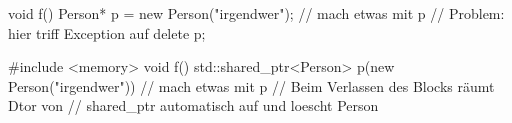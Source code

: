 void f()
{
    Person* p = new Person("irgendwer");
    // mach etwas mit p
    // Problem: hier triff Exception auf
    delete p;
}



#include <memory>
void f()
{
    std::shared_ptr<Person> p(new Person("irgendwer"))
    // mach etwas mit p
    // Beim Verlassen des Blocks räumt Dtor von 
    // shared_ptr automatisch auf und loescht Person
}